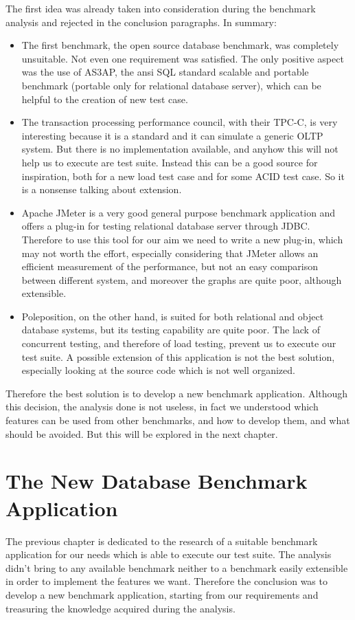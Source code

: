 The first idea was already taken into consideration during the benchmark analysis and rejected in the conclusion paragraphs. In summary:
\begin{itemize}
	\item The first benchmark, the open source database benchmark, was completely unsuitable. Not even one requirement was satisfied. The only positive aspect was the use of AS3AP, the ansi SQL standard scalable and portable benchmark (portable only for relational database server), which can be helpful to the creation of new test case.
	\item The transaction processing performance council, with their TPC-C, is very interesting because it is a standard and it can simulate a generic OLTP system. But there is no implementation available, and anyhow this will not help us to execute are test suite. Instead this can be a good source for inspiration, both for a new load test case and for some ACID test case. So it is a nonsense talking about extension.
	\item Apache JMeter is a very good general purpose benchmark application and offers a plug-in for testing relational database server through JDBC. Therefore to use this tool for our aim we need to write a new plug-in, which may not worth the effort, especially considering that JMeter allows an efficient measurement of the performance, but not an easy comparison between different system, and moreover the graphs are quite poor, although extensible.
	\item Poleposition, on the other hand, is suited for both relational and object database systems, but its testing capability are quite poor. The lack of concurrent testing, and therefore of load testing, prevent us to execute our test suite. A possible extension of this application is not the best solution, especially looking at the source code which is not well organized.
\end{itemize}

Therefore the best solution is to develop a new benchmark application. Although this decision, the analysis done is not useless, in fact we understood which features can be used from other benchmarks, and how to develop them, and what should be avoided. But this will be explored in the next chapter.
	
\chapter{The New Database Benchmark Application}
The previous chapter is dedicated to the research of a suitable benchmark application for our needs which is able to execute our test suite. The analysis didn't bring to any available benchmark neither to a benchmark easily extensible in order to implement the features we want. Therefore the conclusion was to develop a new benchmark application, starting from our requirements and treasuring the knowledge acquired during the analysis.

